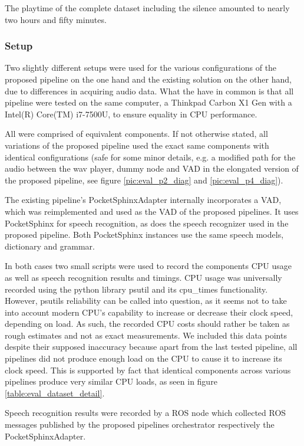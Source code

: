 The playtime of the complete dataset including the silence amounted to nearly two hours and fifty minutes.

\subsubsection{Setup}
\label{eval:dataset:setup}

Two slightly different setups were used for the various configurations of the proposed pipeline on the one hand and the existing solution on the other hand, due to differences in acquiring audio data.
What the have in common is that all pipeline were tested on the same computer, a Thinkpad Carbon X1 Gen with a Intel(R) Core(TM) i7-7500U, to ensure equality in CPU performance.

All were comprised of equivalent components. 
If not otherwise stated, all variations of the proposed pipeline used the exact same components with identical configurations (safe for some minor details, e.g. a modified path for the audio between the wav player, dummy node and VAD in the elongated version of the proposed pipeline, see figure \ref{pic:eval_p2_diag} and \ref{pic:eval_p4_diag}).

The existing pipeline's PocketSphinxAdapter internally incorporates a VAD, which was reimplemented and used as the VAD of the proposed pipelines.
It uses PocketSphinx for speech recognition, as does the speech recognizer used in the proposed pipeline. 
Both PocketSphinx instances use the same speech models, dictionary and grammar.

In both cases two small scripts were used to record the components CPU usage as well as speech recognition results and timings.
CPU usage was universally recorded using the python library psutil and its cpu\_times functionality.
However, psutils reliability can be called into question, as it seems not to take into account modern CPU's capability to increase or decrease their clock speed, depending on load.
As such, the recorded CPU costs should rather be taken as rough estimates and not as exact measurements.
We included this data points despite their supposed inaccuracy because apart from the last tested pipeline, all pipelines did not produce enough load on the CPU to cause it to increase its clock speed.
This is supported by fact that identical components across various pipelines produce very similar CPU loads, as seen in figure 
\ref{table:eval_dataset_detail}.

Speech recognition results were recorded by a ROS node which collected ROS messages published by the proposed pipelines orchestrator respectively the PocketSphinxAdapter.

